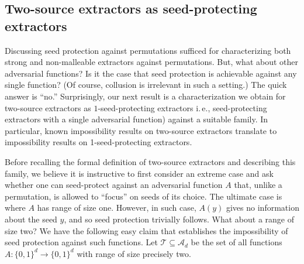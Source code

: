 \documentclass[11pt]{article}
\numberwithin{equation}{section}
\theoremstyle{definition}
\theoremstyle{plain}
\newcommand{\ie}{i.\,e.}
\newcommand{\adv}{A}
\newcommand{\advpair}{\mathcal{T}}
\begin{document}
%

\subsection{Two-source extractors as seed-protecting extractors}\label{sec:intro two source sp}

Discussing seed protection against permutations sufficed for characterizing both strong and non-malleable extractors against permutations. 
But, what about other adversarial functions? Is it the case that seed protection is achievable against any single function?
%
(Of course, collusion is irrelevant in such a setting.) %
The quick answer is %
``no.''   %
Surprisingly, our next result is a characterization we obtain for two-source extractors as $1$-seed-protecting extractors %
\ie,  %
seed-protecting extractors with a single adversarial function) against a suitable family. In particular, known impossibility results on two-source extractors translate to impossibility results on 1-seed-protecting extractors. %

%

Before recalling the formal definition of two-source extractors and describing this family, we believe it is instructive to first consider an extreme case and ask whether one can seed-protect against an adversarial function $\adv$ that, unlike a permutation, is allowed to ``focus'' on seeds of its choice.  The ultimate case is where $\adv$ has range of size one.  %
%
%
However, in such case, $\adv(y)$ gives no information about the seed $y$, and so seed %
protection  %
trivially follows. What about
a  %
range of size two? We have the following easy claim that establishes
the  %
%
impossibility of seed protection against such functions. Let $\advpair \subseteq \mathcal{A}_d$ be the set of all functions $\adv \colon \{0,1\}^d \to \{0,1\}^d$ with range of size precisely two.
%
\end{document}
